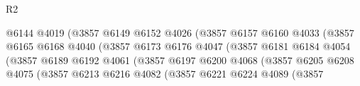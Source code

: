 \begin{lexlean}{R2}
\begin{coremodule}
                                            @6144
                                            @4019
                                            (@3857
                                              @6149
                                              @6152
                                              @4026
                                              (@3857
                                                @6157
                                                @6160
                                                @4033
                                                (@3857
                                                  @6165
                                                  @6168
                                                  @4040
                                                  (@3857
                                                    @6173
                                                    @6176
                                                    @4047
                                                    (@3857
                                                      @6181
                                                      @6184
                                                      @4054
                                                      (@3857
                                                        @6189
                                                        @6192
                                                        @4061
                                                        (@3857
                                                          @6197
                                                          @6200
                                                          @4068
                                                          (@3857
                                                            @6205
                                                            @6208
                                                            @4075
                                                            (@3857
                                                              @6213
                                                              @6216
                                                              @4082
                                                              (@3857
                                                                @6221
                                                                @6224
                                                                @4089
                                                                (@3857

\end{coremodule}
\end{lexlean}
